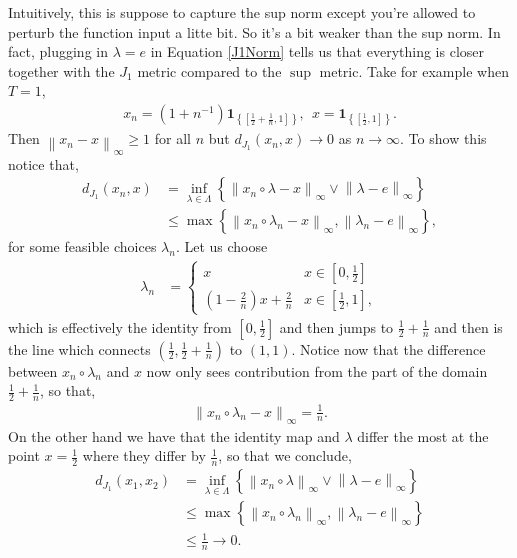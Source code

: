 \documentclass[12pt]{article}
\newcommand\norm[1]{\left\lVert#1\right\rVert}
\theoremstyle{definition}
\theoremstyle{definition}
\theoremstyle{definition}
\begin{document}
Intuitively, this is suppose to capture the sup norm except you're allowed to perturb the function input a litte bit. So it's a bit weaker than the sup norm. In fact, plugging in $\lambda=e$ in Equation \ref{J1Norm} tells us that everything is closer together with the $J_1$ metric compared to the $\sup$ metric. Take for example when $T=1$,
\begin{align*}
x_n=(1+n^{-1})\bm{1}_{\left\{[\frac{1}{2}+\frac{1}{n},1]\right\}}, \ \ x = \bm{1}_{\left\{[\frac{1}{2},1]\right\}}.
\end{align*}
Then $\norm{x_n-x}_{\infty}\geq 1$ for all $n$ but $d_{J_1}(x_n,x)\rightarrow 0$ as $n\rightarrow\infty$. To show this notice that,
\begin{align*}
d_{J_1}(x_n,x)&=\inf_{\lambda\in \Lambda}\left\{\norm{x_n\circ \lambda - x}_\infty \lor \norm{\lambda-e}_{\infty}\right\}\\
&\leq \max\left\{\norm{x_n\circ \lambda_n-x}_\infty, \norm{\lambda_n-e}_{\infty}\right\},
\end{align*}
for some feasible choices $\lambda_n$. Let us choose 
\begin{align*}
\lambda_n&=\begin{cases} x & x\in [0,\frac{1}{2}]\\
(1-\frac{2}{n})x + \frac{2}{n}& x\in [\frac{1}{2},1],
\end{cases}
\end{align*}
which is effectively the identity from $[0,\frac{1}{2}]$ and then jumps to $\frac{1}{2}+\frac{1}{n}$ and then is the line which connects $(\frac{1}{2},\frac{1}{2}+\frac{1}{n})$ to $(1,1)$. Notice now that the difference between $x_n\circ \lambda_n$ and $x$ now only sees contribution from the part of the domain $\frac{1}{2}+\frac{1}{n}$, so that,
\begin{align*}
\norm{x_n\circ \lambda_n-x}_{\infty}= \frac{1}{n}.
\end{align*}
On the other hand we have that the identity map and $\lambda$ differ the most at the point $x=\frac{1}{2}$ where they differ by $\frac{1}{n}$, so that we conclude,
\begin{align*}
d_{J_1}(x_1,x_2)&=\inf_{\lambda\in \Lambda}\left\{\norm{x_n\circ \lambda}_\infty \lor \norm{\lambda-e}_{\infty}\right\}\\
&\leq \max\left\{\norm{x_n\circ \lambda_n}_\infty, \norm{\lambda_n-e}_{\infty}\right\}\\
&\leq \frac{1}{n}\rightarrow0.
\end{align*}
\clearpage
\end{document}
